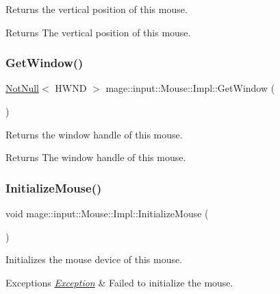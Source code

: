 Returns the vertical position of this mouse.

\begin{DoxyReturn}{Returns}
The vertical position of this mouse. 
\end{DoxyReturn}
\mbox{\label{classmage_1_1input_1_1_mouse_1_1_impl_a53b080d8835ebb887fcadbba57131f00}} 
\subsubsection{\texorpdfstring{Get\+Window()}{GetWindow()}}
{\footnotesize\ttfamily \mbox{\hyperlink{namespacemage_a8769f9d670d6b585ea306cb1062af94b}{Not\+Null}}$<$ H\+W\+ND $>$ mage\+::input\+::\+Mouse\+::\+Impl\+::\+Get\+Window (\begin{DoxyParamCaption}{ }\end{DoxyParamCaption})\hspace{0.3cm}{\ttfamily [noexcept]}}

Returns the window handle of this mouse.

\begin{DoxyReturn}{Returns}
The window handle of this mouse. 
\end{DoxyReturn}
\mbox{\label{classmage_1_1input_1_1_mouse_1_1_impl_ae290eaa8d1db619a3123f88e452d382a}} 
\subsubsection{\texorpdfstring{Initialize\+Mouse()}{InitializeMouse()}}
{\footnotesize\ttfamily void mage\+::input\+::\+Mouse\+::\+Impl\+::\+Initialize\+Mouse (\begin{DoxyParamCaption}{ }\end{DoxyParamCaption})\hspace{0.3cm}{\ttfamily [private]}}

Initializes the mouse device of this mouse.


\begin{DoxyExceptions}{Exceptions}
{\em \mbox{\hyperlink{classmage_1_1_exception}{Exception}}} & Failed to initialize the mouse. \\
\hline
\end{DoxyExceptions}
\mbox{\label{classmage_1_1input_1_1_mouse_1_1_impl_a7ca0f042e7d201c312ab26f4bb9e0604}} 
